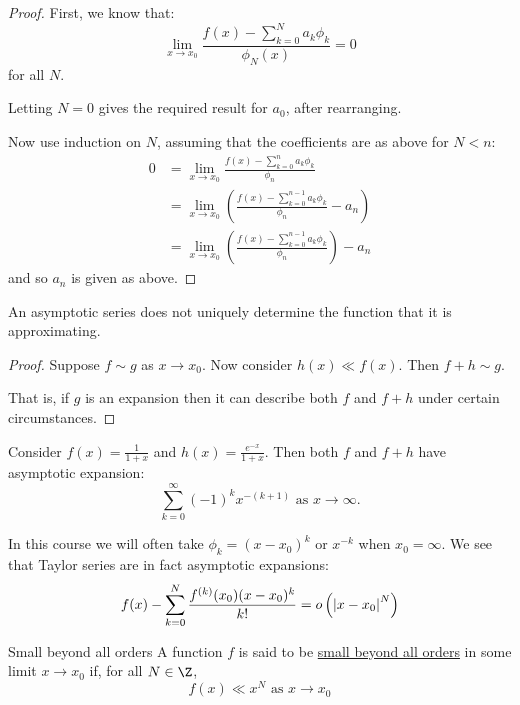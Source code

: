 \documentclass[../Main.tex]{subfiles}
\begin{document}
\begin{proof}
    First, we know that:
    \begin{equation*}
        \lim_{x \to x_0} \frac{f(x) - \sum_{k=0}^{N} a_k \phi_k}{\phi_N(x)} = 0
    \end{equation*}
    for all $N$.

    Letting $N = 0$ gives the required result for $a_0$, after rearranging.

    Now use induction on $N$, assuming that the coefficients are as above for $N < n$:
    \begin{align*}
        0 &= \lim_{x \to x_0} \frac{f(x) - \sum_{k=0}^{n}a_k \phi_k}{\phi_n} \\
        &= \lim_{x \to x_0} \left(\frac{f(x) - \sum_{k=0}^{n-1}a_k \phi_k}{\phi_n} - a_n\right) \\
        &= \lim_{x \to x_0} \left(\frac{f(x) - \sum_{k=0}^{n-1}a_k \phi_k}{\phi_n}\right) - a_n
    \end{align*}
    and so $a_n$ is given as above.
\end{proof}
\begin{proposition}
    An asymptotic series does not uniquely determine the function that it is approximating.
    \label{propAsyDoesNotGiveF}
\end{proposition}
\begin{proof}
    Suppose $f \sim g$ as $x \to x_0$. Now consider $h(x) \ll f(x)$. Then $f + h \sim g$.

    That is, if $g$ is an expansion then it can describe both $f$ and $f + h$ under certain circumstances.
\end{proof}
\begin{example}
    Consider $f(x) = \frac{1}{1+x}$ and $h(x) = \frac{e^{-x}}{1 + x}$. Then both $f$ and $f + h$ have asymptotic expansion:
    \begin{equation*}
        \sum_{k=0}^{\infty} (-1)^k x^{-(k+1)} \text{ as $x \to \infty$.}
    \end{equation*}
\end{example}
In this course we will often take $\phi_k = (x - x_0)^k$ or $x^{-k}$ when $x_0 = \infty$. We see that Taylor series are in fact asymptotic expansions:
\begin{equation*}
    f(x) - \sum_{k=0}^{N} \frac{f^{(k)}(x_0)(x - x_0)^k}{k!} = o\left(\left|x - x_0\right|^N\right)
\end{equation*}
\begin{definition}{Small beyond all orders}
    A function $f$ is said to be \underline{small beyond all orders} in some limit $x \to x_0$ if, for all $N \in \Z$,
    \begin{equation*}
        f(x) \ll x^N \text{ as $x \to x_0$}
    \end{equation*}
\end{definition}
\end{document}
